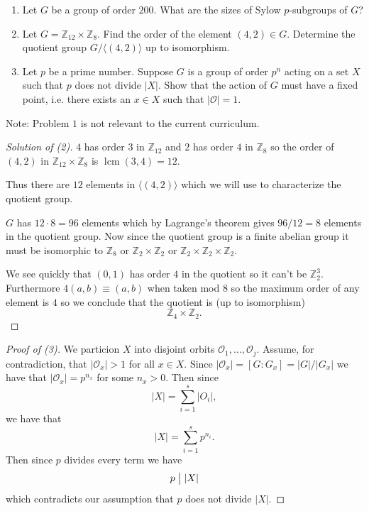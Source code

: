 \begin{prob}
    \medskip 
    \noindent
    \begin{enumerate}
        \item Let $G$ be a group of order $200$.  
            What are the sizes of Sylow $p$-subgroups of $G$? 
        \item Let $G = \mathbb Z_{12} \times \mathbb Z_8$. Find 
            the order of the element $(4,2) \in G$. 
            Determine the quotient group $G / \langle (4,2)\rangle$
            up to isomorphism.
        \item Let $p$ be a prime number. Suppose $G$ is a group 
            of order $p^n$ acting on a set $X$ such that 
            $p$ does not divide $|X|$. Show that the 
            action of $G$ must have a fixed point, i.e. 
            there exists an $x \in X$ such that $|\mathcal O| = 1$. 
    \end{enumerate}

    Note: Problem $1$ is not relevant to the current curriculum.
\end{prob}
\begin{proof}[Solution of (2)]
    $4$ has order $3$ in $\mathbb Z_{12}$ and $2$ has order 
    $4$ in $\mathbb Z_8$ so the order of $(4,2)$ in $\mathbb Z_{12} 
    \times \mathbb Z_8$ is $\operatorname{lcm}(3,4) = 12$.

    Thus there are $12$ elements in $\langle (4,2) \rangle$ which 
    we will use to characterize the quotient group.

    $G$ has $12 \cdot 8 = 96$ elements which by Lagrange's theorem 
    gives $96/12 = 8$ elements in the quotient group.
    Now since the quotient group is a finite abelian group 
    it must be isomorphic to $\mathbb Z_8$ or $\mathbb Z_2 \times 
    \mathbb Z_2$ or $\mathbb Z_2 \times \mathbb Z_2 \times 
    \mathbb Z_2$.

    We see quickly that $(0,1)$ has order $4$ in the quotient 
    so it can't be $\mathbb Z_2^3$. Furthermore $4(a,b) \equiv (a,b)$
    when taken mod $8$ so the maximum order of any element is 
    $4$ so we conclude that the quotient is (up to isomorphism) 
    \[
        \mathbb Z_4 \times \mathbb Z_2.
    \]
\end{proof}
\begin{proof}[Proof of (3)]
    We particion $X$ into disjoint orbits 
    $\mathcal O_1,\ldots, \mathcal O_j$. Assume, for contradiction,
    that $|\mathcal O_x| > 1$ for all $x \in X$.
    Since $|\mathcal O_x| = [G:G_x] = |G|/|G_x|$ we have that 
    $|\mathcal O_x| = p^{n_x}$ for some $n_x > 0$. Then 
    since 
    \[
        |X| = \sum_{i=1}^s |O_i|,
    \]
    we have that 
    \[
        |X| = \sum_{i=1}^s p^{n_i}.
    \]
    Then since $p$ divides every term we have 
    \[
        p \bigm| |X|
    \]
    which contradicts our assumption that $p$ does not divide 
    $|X|$.
\end{proof}

